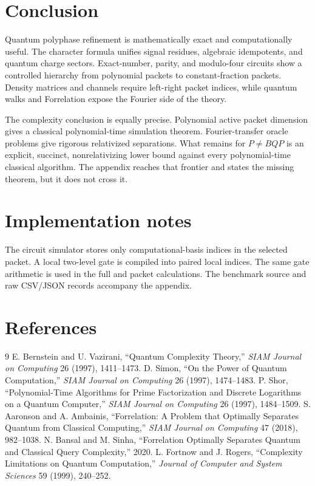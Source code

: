 \documentclass[11pt]{article}
\begin{document}
\section{Conclusion}

Quantum polyphase refinement is mathematically exact and computationally useful.  The character formula unifies signal residues, algebraic idempotents, and quantum charge sectors.  Exact-number, parity, and modulo-four circuits show a controlled hierarchy from polynomial packets to constant-fraction packets.  Density matrices and channels require left-right packet indices, while quantum walks and Forrelation expose the Fourier side of the theory.

The complexity conclusion is equally precise.  Polynomial active packet dimension gives a classical polynomial-time simulation theorem.  Fourier-transfer oracle problems give rigorous relativized separations.  What remains for $P\ne BQP$ is an explicit, succinct, nonrelativizing lower bound against every polynomial-time classical algorithm.  The appendix reaches that frontier and states the missing theorem, but it does not cross it.

\appendix
\section{Implementation notes}

The circuit simulator stores only computational-basis indices in the selected packet.  A local two-level gate is compiled into paired local indices.  The same gate arithmetic is used in the full and packet calculations.  The benchmark source and raw CSV/JSON records accompany the appendix.

\section{References}
\begin{thebibliography}{9}
E. Bernstein and U. Vazirani, ``Quantum Complexity Theory,'' \emph{SIAM Journal on Computing} 26 (1997), 1411--1473.
D. Simon, ``On the Power of Quantum Computation,'' \emph{SIAM Journal on Computing} 26 (1997), 1474--1483.
P. Shor, ``Polynomial-Time Algorithms for Prime Factorization and Discrete Logarithms on a Quantum Computer,'' \emph{SIAM Journal on Computing} 26 (1997), 1484--1509.
S. Aaronson and A. Ambainis, ``Forrelation: A Problem that Optimally Separates Quantum from Classical Computing,'' \emph{SIAM Journal on Computing} 47 (2018), 982--1038.
N. Bansal and M. Sinha, ``Forrelation Optimally Separates Quantum and Classical Query Complexity,'' 2020.
L. Fortnow and J. Rogers, ``Complexity Limitations on Quantum Computation,'' \emph{Journal of Computer and System Sciences} 59 (1999), 240--252.
\end{thebibliography}
\end{document}
